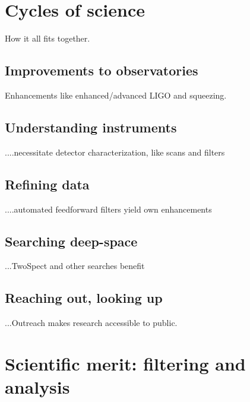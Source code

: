 


 
    \section{Cycles of science}
    \label{cycles}

        How it all fits together.



        \subsection{Improvements to observatories}
        \label{observatories_better}

            Enhancements like enhanced/advanced LIGO and squeezing.

        \subsection{Understanding instruments}
        \label{instrumental_understanding}

            ....necessitate detector characterization, like scans and filters

        \subsection{Refining data}
        \label{data_refinements}

            ....automated feedforward filters yield own enhancements

        \subsection{Searching deep-space}
        \label{searching_space}

            ...TwoSpect and other searches benefit

        \subsection{Reaching out, looking up}
        \label{reaching_out}

            ...Outreach makes research accessible to public.

    \section{Scientific merit: filtering and analysis}
    \label{merit}

